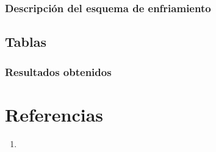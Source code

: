 \documentclass{article}
\begin{document}
\subsubsection*{Descripción del esquema de enfriamiento}

\subsection*{Tablas}

\subsubsection*{Resultados obtenidos}

\newpage
\section*{Referencias}
\begin{enumerate}
	\item 
\end{enumerate}
\end{document}
